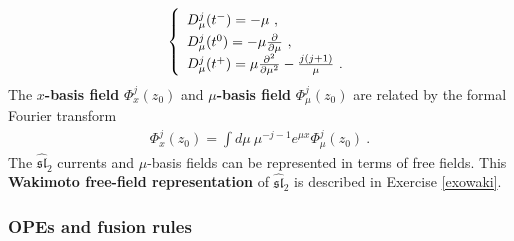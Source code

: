 \documentclass[12pt, a4paper, notitlepage, twoside]{report}
\numberwithin{equation}{section}
\theoremstyle{break}
\begin{document}
\begin{align}
\renewcommand{\arraystretch}{1.3}
\left\{\begin{array}{l}  
 D_\mu^j(t^-) = -\mu \ , \\  D_\mu^j(t^0) = -\mu{\frac{\partial}{\partial \mu}} \ , \\ D_\mu^j(t^+) = \mu\frac{\partial^2}{\partial\mu^2} -\frac{j(j+1)}{\mu}\ . \end{array}\right. 
\label{mub}
\end{align}
The \textbf{\boldmath $x$-basis field} $\Phi^j_x(z_0)$ and \textbf{\boldmath $\mu$-basis field} $\Phi^j_\mu(z_0)$ are related by the formal Fourier transform
\begin{align}
 \Phi_x^j(z_0) = \int d\mu\ \mu^{-j-1}e^{\mu x} \Phi_\mu^j(z_0)\ .
\label{emx}
\end{align}
The $\widehat{\mathfrak{sl}}_2$ currents and $\mu$-basis fields can be represented in terms of free fields.
This \textbf{Wakimoto free-field representation} of $\widehat{\mathfrak{sl}}_2$ is described in Exercise \ref{exowaki}.

\subsubsection{OPEs and fusion rules}
\end{document}
